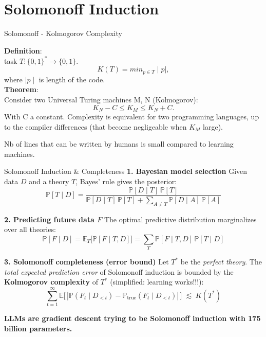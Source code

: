 \documentclass{beamer}
\begin{document}
\section{Solomonoff Induction}
\begin{frame}{Solomonoff - Kolmogorov  Complexity}

{\bf Definition}:\\
task $T: \{0,1\}^* \to \{0,1\}$. 
$$K(T) = min_{p\in T} \mid p \mid, $$
   where $\mid p \mid$ is length of the code. \\
\medskip
\medskip
{\bf Theorem}:\\
Consider two Universal Turing machines M, N (Kolmogorov):
$$K_N-C \leq K_M \leq K_N + C .$$
With C a constant.  Complexity is equivalent for two  programming languages, up to the compiler differences (that become negligeable when $K_M$ large).


  
\bigskip 

Nb of lines that can be written by humans is small compared to learning machines.

\end{frame}




\begin{frame}{Solomonoff Induction \& Completeness}
\scriptsize
\textbf{1. Bayesian model selection}  
Given data $D$ and a theory $T$, Bayes’ rule gives the posterior:
\[
\mathbb{P}[T \mid D] = 
\frac{\mathbb{P}[D \mid T]\, \mathbb{P}[T]}
{\mathbb{P}[D \mid T]\, \mathbb{P}[T] + \sum_{A \neq T} \mathbb{P}[D \mid A]\, \mathbb{P}[A]}
\]

\medskip
\textbf{2. Predicting future data $F$}  
The optimal predictive distribution marginalizes over all theories:
\[
\mathbb{P}[F \mid D] = \mathbb{E}_T\!\big[ \mathbb{P}[F \mid T, D] \big] 
= \sum_T \mathbb{P}[F \mid T, D]\, \mathbb{P}[T \mid D]
\]

\medskip
\textbf{3. Solomonoff completeness (error bound)}  
Let $T^*$ be the {\it perfect theory}. The \textit{total expected prediction error} of Solomonoff induction is bounded by the \textbf{Kolmogorov complexity} of $T^*$ (simplified: learning works!!!):
\[
\sum_{t=1}^\infty \mathbb{E}\big[ \, |\mathbb{P}(F_t \mid D_{<t}) - \mathbb{P}_{\text{true}}(F_t \mid D_{<t})| \, \big] \;\lesssim\; K(T^*)
\]


\smallskip
\textcolor{new_turquoise}{
\textbf{LLMs are gradient descent trying to be Solomonoff induction with 175 billion parameters.}
}

\end{frame}
\end{document}
